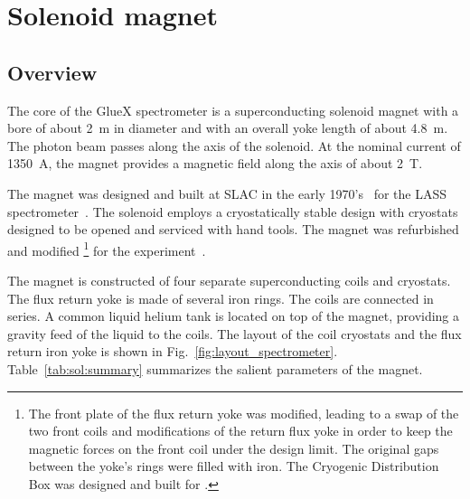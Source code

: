 
\section[Solenoid Magnet]{Solenoid magnet 
  \label{sec:solenoid}
}

\subsection[Overview]{Overview \label{sec:sol:overview}
}

The core of the GlueX spectrometer is a superconducting
solenoid magnet with a bore of about 2~m in diameter and with an overall 
yoke length of about 4.8~m. The photon beam passes along the axis of
the solenoid.  At the nominal current of 1350~A, the magnet provides a magnetic field along the axis of about 2~T.

The magnet was designed and built at SLAC in the early
1970's~\cite{Alcorn-confer-1972} for the LASS
spectrometer~\cite{Aston:1987uc}. The solenoid employs a cryostatically
stable design with cryostats designed to be opened and
serviced with hand tools. The magnet was refurbished and modified%
\footnote{
  The front plate of the flux return yoke was modified, leading to a
  swap of the two front coils and modifications of the return flux
  yoke in order to keep the magnetic forces on the front coil under
  the design limit.  The original gaps between the yoke's rings were
  filled with iron. The Cryogenic Distribution Box was designed and
  built for \gx{}.
} 
for the \gx{} experiment~\cite{Ballard:2011tm, Ballard:2015wma}. 

The magnet is constructed of four separate superconducting coils and
cryo\-stats. The flux return yoke is made of several iron rings.  The
coils are connected in series. A common liquid helium tank is located
on top of the magnet, providing a gravity feed of the liquid to the
coils. The layout of the coil cryostats and the flux return iron
yoke is shown in Fig.~\ref{fig:layout_spectrometer}.
Table~\ref{tab:sol:summary} summarizes the salient parameters of the  magnet.

  

